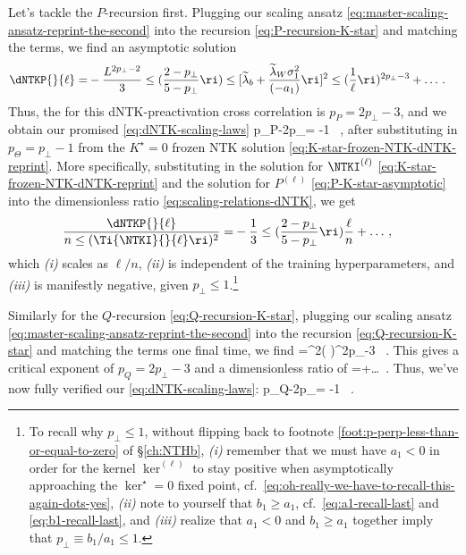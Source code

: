 Let's tackle the
$P$-recursion first.  Plugging our scaling ansatz \eqref{eq:master-scaling-ansatz-reprint-the-second} into the recursion \eqref{eq:P-recursion-K-star} and matching the terms, we find an asymptotic solution
\begin{align}\label{eq:P-K-star-asymptotic}
\dNTKP{}{\ell}=&-\frac{L^{2p_\perp-2}}{3}\le(\frac{2-p_{\perp}}{5-p_{\perp}} \ri) \le[\widetilde{\lambda}_b+\frac{\widetilde{\lambda}_W\sigma_1^2}{(-a_1)}\ri]^2\le( \frac{1}{\ell}\ri)^{2p_{\perp}-3 }+\ldots\, .
\end{align}
Thus, the  for this dNTK-preactivation cross correlation is $p_P = 2p_{\perp}-3$, and we obtain our promised  \eqref{eq:dNTK-scaling-laws} 
\be
p_P-2p_\Theta = -1 \, ,
\ee
after substituting in $p_\Theta = p_\perp - 1$ from the $K^\star=0$ frozen NTK solution \eqref{eq:K-star-frozen-NTK-dNTK-reprint}. More specifically, substituting in the solution for $\NTKI^{(\ell)}$ \eqref{eq:K-star-frozen-NTK-dNTK-reprint} and  the solution for $P^{(\ell)}$ \eqref{eq:P-K-star-asymptotic} into the dimensionless ratio \eqref{eq:scaling-relations-dNTK}, we get
\begin{align}
\frac{\dNTKP{}{\ell}}{n \le(\Ti{\NTKI}{}{\ell} \ri)^2}=&-\frac{1}{3}\le(\frac{2-p_{\perp}}{5-p_{\perp}} \ri) \frac{\ell}{n} +\ldots\, ,
\end{align}
which  \emph{(i)} scales as $\ell/n$,  \emph{(ii)} is independent of the training hyperparameters, and \emph{(iii)} is manifestly negative, given $p_{\perp}\leq1$.\footnote{
To recall why $p_{\perp}\leq1$, without flipping back to footnote \ref{foot:p-perp-less-than-or-equal-to-zero} of \S\ref{ch:NTHb}, \emph{(i)} remember that we must have $a_1<0$ in order for the kernel $\ker^{(\ell)}$ to stay positive when asymptotically approaching the $\ker^{\star}=0$ fixed point, cf.~\eqref{eq:oh-really-we-have-to-recall-this-again-dots-yes}, \emph{(ii)} note to yourself that $b_1 \geq a_1$, cf.~\eqref{eq:a1-recall-last} and \eqref{eq:b1-recall-last}, and \emph{(iii)} realize that $a_1<0$ and $b_1 \geq a_1$ together imply that $p_\perp \equiv b_1 / a_1\leq1$.}

Similarly for the $Q$-recursion \eqref{eq:Q-recursion-K-star}, plugging our scaling ansatz \eqref{eq:master-scaling-ansatz-reprint-the-second} into the recursion \eqref{eq:Q-recursion-K-star} and matching the terms one final time, we find
\be
\dNTKQ{}{\ell}=^2\le( \ri)^{2p_{\perp}-3} \, .
\ee
This gives a critical exponent of $p_Q = 2p_\perp -3$ and a dimensionless ratio of
\be\label{eq:Q-ratio}
=  +\ldots \, .
\ee
Thus, we've now fully verified our  \eqref{eq:dNTK-scaling-laws}: 
\be
p_Q-2p_\Theta = -1 \, .
\ee








